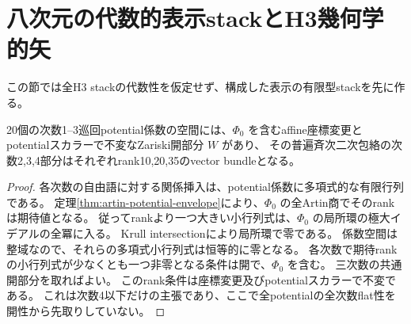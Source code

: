 \section{八次元の代数的表示stackとH3幾何学的矢}
\label{sec:presentation-stack}
この節では全H3 stackの代数性を仮定せず、構成した表示の有限型stackを先に作る。

\begin{lemma}[有限次数の平坦表示開部分]\label{lem:finite-presentation-open}
20個の次数1--3巡回potential係数の空間には、$\Phi_0$ を含むaffine座標変更とpotentialスカラーで不変なZariski開部分 $W$ があり、
その普遍斉次二次包絡の次数2,3,4部分はそれぞれrank10,20,35のvector bundleとなる。
\end{lemma}
\begin{proof}
各次数の自由語に対する関係挿入は、potential係数に多項式的な有限行列である。
定理\ref{thm:artin-potential-envelope}により、$\Phi_0$ の全Artin商でそのrankは期待値となる。
従ってrankより一つ大きい小行列式は、$\Phi_0$ の局所環の極大イデアルの全冪に入る。
Krull intersectionにより局所環で零である。
係数空間は整域なので、それらの多項式小行列式は恒等的に零となる。
各次数で期待rankの小行列式が少なくとも一つ非零となる条件は開で、$\Phi_0$ を含む。
三次数の共通開部分を取ればよい。
このrank条件は座標変更及びpotentialスカラーで不変である。
これは次数4以下だけの主張であり、ここで全potentialの全次数flat性を開性から先取りしていない。
\end{proof}

